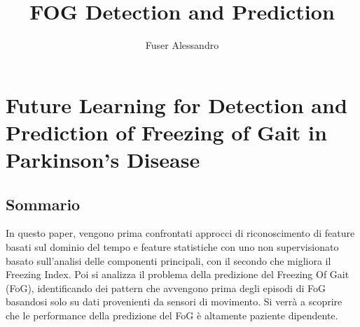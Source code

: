 \documentclass[a4paper,11pt]{article} %
\begin{document}
\author{Fuser Alessandro}
\title{FOG Detection and Prediction}
\maketitle

\tableofcontents

\newpage

\section{Future Learning for Detection and Prediction of Freezing of Gait in Parkinson's Disease\cite{uno}}
\subsection{Sommario}
In questo paper, vengono prima confrontati approcci di riconoscimento di feature basati sul dominio del tempo e feature statistiche con uno non supervisionato basato sull'analisi delle componenti principali, con il secondo che migliora il Freezing Index. Poi si analizza il problema della predizione del Freezing Of Gait (FoG), identificando dei pattern che avvengono prima degli episodi di FoG basandosi solo su dati provenienti da sensori di movimento. Si verrà a scoprire che le performance della predizione del FoG è altamente paziente dipendente.
\end{document}
